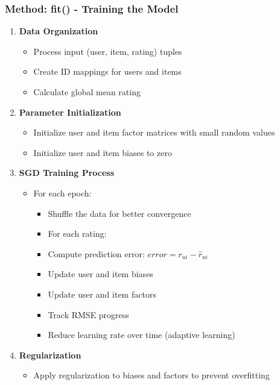 \documentclass{beamer}
\begin{document}
\begin{frame}
\frametitle{Method: fit() - Training the Model}

\begin{enumerate}
    \item \textbf{Data Organization}
    \begin{itemize}
        \item Process input (user, item, rating) tuples
        \item Create ID mappings for users and items
        \item Calculate global mean rating
    \end{itemize}
    
    \item \textbf{Parameter Initialization}
    \begin{itemize}
        \item Initialize user and item factor matrices with small random values
        \item Initialize user and item biases to zero
    \end{itemize}
    
    \item \textbf{SGD Training Process}
    \begin{itemize}
        \item For each epoch:
        \begin{itemize}
            \item Shuffle the data for better convergence
            \item For each rating:
                \item Compute prediction error: $error = r_{ui} - \hat{r}_{ui}$
                \item Update user and item biases
                \item Update user and item factors
            \item Track RMSE progress
            \item Reduce learning rate over time (adaptive learning)
        \end{itemize}
    \end{itemize}
    
    \item \textbf{Regularization}
    \begin{itemize}
        \item Apply regularization to biases and factors to prevent overfitting
    \end{itemize}
\end{enumerate}
\end{frame}
\end{document}
